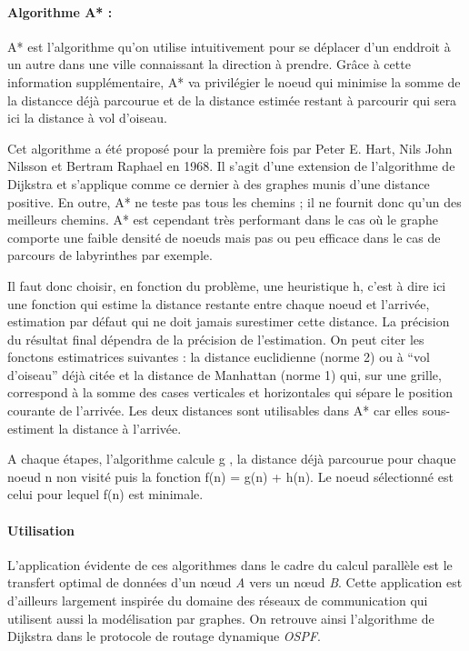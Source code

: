 \paragraph{Algorithme A* : }

A* est l'algorithme qu'on utilise intuitivement pour se déplacer d'un enddroit à un autre dans une ville
connaissant la direction à prendre. Grâce à cette information supplémentaire, A* va privilégier le noeud qui minimise 
la somme de la distancce déjà parcourue et de la distance estimée restant à parcourir qui sera ici la distance à vol d'oiseau.


Cet algorithme a été proposé pour la première fois 
par Peter E. Hart, Nils John Nilsson et Bertram Raphael
en 1968. Il s'agit d'une extension de l'algorithme de Dijkstra et s'applique comme ce dernier
à des graphes munis d'une distance positive. En outre, A* ne teste pas tous les chemins ; il ne fournit donc
qu'un des meilleurs chemins. A* est cependant très performant dans le cas où le graphe comporte une faible densité de noeuds 
mais pas ou peu efficace dans le cas de parcours de labyrinthes par exemple.


Il faut donc choisir, en fonction du problème, une heuristique h, c'est à dire ici une fonction qui estime la distance 
restante entre chaque noeud et l'arrivée, estimation par défaut qui ne doit jamais surestimer cette distance. 
La précision du résultat final dépendra de la précision de l'estimation.
On peut citer les fonctons estimatrices suivantes :  la distance euclidienne (norme 2) ou à ``vol d'oiseau'' déjà citée 
et la distance de Manhattan (norme 1) qui, sur une grille, correspond à la somme des cases verticales et horizontales
qui sépare le position courante de l'arrivée. Les deux distances sont utilisables dans A* car elles sous-estiment
la distance à l'arrivée.


A chaque étapes, l'algorithme calcule g , la distance déjà parcourue pour chaque noeud n non visité puis
la fonction f(n) = g(n) + h(n). Le noeud sélectionné est celui pour lequel f(n) est minimale.




\paragraph{Utilisation} L'application évidente de ces algorithmes dans le cadre du calcul parallèle est le transfert optimal de données d'un nœud \textit{A} vers un nœud \textit{B}. Cette application est d'ailleurs largement inspirée du domaine des réseaux de communication qui utilisent aussi la modélisation par graphes. On retrouve ainsi l'algorithme de Dijkstra dans le protocole de routage dynamique \textit{OSPF}.

